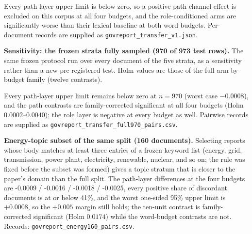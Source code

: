 \documentclass[11pt]{article}
\begin{document}
Every path-layer upper limit is below zero, so a positive path-channel effect is excluded on this corpus at all four budgets, and the role-conditioned arms are significantly worse than their lexical baseline at both word budgets. Per-document records are supplied as \nolinkurl{govreport\_transfer\_v1.json}.

\textbf{Sensitivity: the frozen strata fully sampled (970 of 973 test rows).} The same frozen protocol run over every document of the five strata, as a sensitivity rather than a new pre-registered test. Holm values are those of the full arm-by-budget family (twelve contrasts).

\begin{center}
\small
{}
\end{center}

Every path-layer upper limit remains below zero at $n=970$ (worst case $-0.0008$), and the path contrasts are family-corrected significant at all four budgets (Holm $0.0002$--$0.0040$); the role layer is negative at every budget as well. Pairwise records are supplied as \nolinkurl{govreport\_transfer\_full970\_pairs.csv}.

\textbf{Energy-topic subset of the same split (160 documents).} Selecting reports whose body matches at least three entries of a frozen keyword list (energy, grid, transmission, power plant, electricity, renewable, nuclear, and so on; the rule was fixed before the subset was formed) gives a topic stratum that is closer to the paper's domain than the full split. The path-layer differences at the four budgets are -0.0009 / -0.0016 / -0.0018 / -0.0025, every positive share of discordant documents is at or below 41\%, and the worst one-sided 95\% upper limit is $+0.0008$, so the $+0.005$ margin still holds; the ten-unit contrast is family-corrected significant (Holm $0.0174$) while the word-budget contrasts are not. Records: \nolinkurl{govreport\_energy160\_pairs.csv}.
\end{document}
